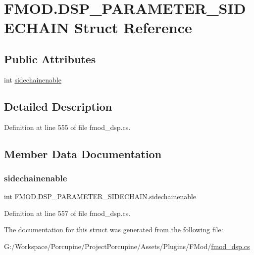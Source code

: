 \hypertarget{struct_f_m_o_d_1_1_d_s_p___p_a_r_a_m_e_t_e_r___s_i_d_e_c_h_a_i_n}{}\section{F\+M\+O\+D.\+D\+S\+P\+\_\+\+P\+A\+R\+A\+M\+E\+T\+E\+R\+\_\+\+S\+I\+D\+E\+C\+H\+A\+IN Struct Reference}
\label{struct_f_m_o_d_1_1_d_s_p___p_a_r_a_m_e_t_e_r___s_i_d_e_c_h_a_i_n}
\subsection*{Public Attributes}
\begin{DoxyCompactItemize}
\item 
int \hyperlink{struct_f_m_o_d_1_1_d_s_p___p_a_r_a_m_e_t_e_r___s_i_d_e_c_h_a_i_n_a5f3453cd8442685f5a34baa8d56cde1e}{sidechainenable}
\end{DoxyCompactItemize}


\subsection{Detailed Description}


Definition at line 555 of file fmod\+\_\+dsp.\+cs.



\subsection{Member Data Documentation}
\mbox{\label{struct_f_m_o_d_1_1_d_s_p___p_a_r_a_m_e_t_e_r___s_i_d_e_c_h_a_i_n_a5f3453cd8442685f5a34baa8d56cde1e}} 
\subsubsection{\texorpdfstring{sidechainenable}{sidechainenable}}
{\footnotesize\ttfamily int F\+M\+O\+D.\+D\+S\+P\+\_\+\+P\+A\+R\+A\+M\+E\+T\+E\+R\+\_\+\+S\+I\+D\+E\+C\+H\+A\+I\+N.\+sidechainenable}



Definition at line 557 of file fmod\+\_\+dsp.\+cs.



The documentation for this struct was generated from the following file\+:\begin{DoxyCompactItemize}
\item 
G\+:/\+Workspace/\+Porcupine/\+Project\+Porcupine/\+Assets/\+Plugins/\+F\+Mod/\hyperlink{fmod__dsp_8cs}{fmod\+\_\+dsp.\+cs}\end{DoxyCompactItemize}

